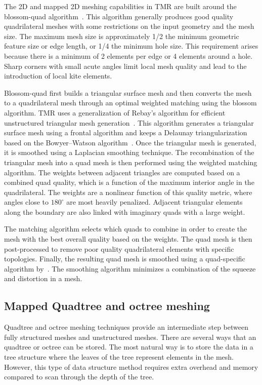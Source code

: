 \documentclass[12pt]{article}
\begin{document}
The 2D and mapped 2D meshing capabilities in TMR are built around the blossom-quad algorithm~\citep{Remacle:2012:blossom-quad}.
This algorithm generally produces good quality quadrilateral meshes with some restrictions on the input geometry and the mesh size.
The maximum mesh size is approximately 1/2 the minimum geometric feature size or edge length, or 1/4 the minimum hole size.
This requirement arises because there is a minimum of 2 elements per edge or 4 elements around a hole.
Sharp corners with small acute angles limit local mesh quality and lead to the introduction of local kite elements. 

Blossom-quad first builds a triangular surface mesh and then converts the mesh to a quadrilateral mesh through an optimal weighted matching using the blossom algorithm.
TMR uses a generalization of Rebay's algorithm for efficient unstructured triangular mesh generation~\citep{Rebay:1993:unstructured-triangle}. This algorithm generates a triangular surface mesh using a frontal algorithm and keeps a Delaunay triangularization based on the Bowyer--Watson algorithm~\citep{Shewchuk:2012:Delaunay-notes}.
Once the triangular mesh is generated, it is smoothed using a Laplacian smoothing technique.
The recombination of the triangular mesh into a quad mesh is then performed using the weighted matching algorithm. 
The weights between adjacent triangles are computed based on a combined quad quality, which is a function of the maximum interior angle in the quadrilateral.
The weights are a nonlinear function of this quality metric, where angles close to $180^{\circ}$ are most heavily penalized.
Adjacent triangular elements along the boundary are also linked with imaginary quads with a large weight.

The matching algorithm selects which quads to combine in order to create the mesh with the best overall quality based on the weights. 
The quad mesh is then post-processed to remove poor quality quadrilateral elements with specific topologies.
Finally, the resulting quad mesh is smoothed using a quad-specific algorithm by~\citet{Giuliani:1982:quad-smoothing}. The smoothing algorithm minimizes a combination of the squeeze and distortion in a mesh. 

\subsection{Mapped Quadtree and octree meshing}

Quadtree and octree meshing techniques provide an intermediate step between fully structured meshes and unstructured meshes. 
There are several ways that an quadtree or octree can be stored.
The most natural way is to store the data in a tree structure where the leaves of the tree represent elements in the mesh.
However, this type of data structure method requires extra overhead and memory compared to scan through the depth of the tree.
\end{document}
